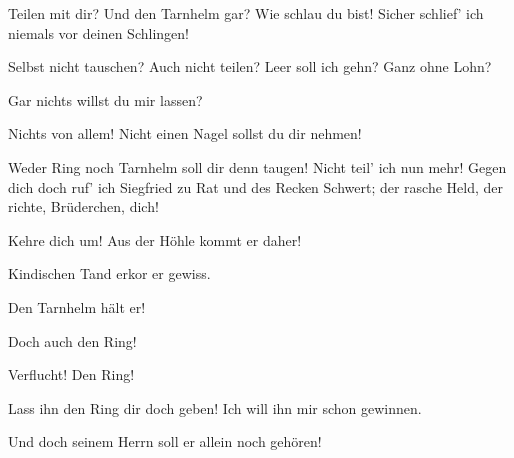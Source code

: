 \begin{drama}

\Alberichspeaks


Teilen mit dir?
Und den Tarnhelm gar?
Wie schlau du bist!
Sicher schlief' ich
niemals vor deinen Schlingen!

\Mimespeaks


Selbst nicht tauschen?
Auch nicht teilen?
Leer soll ich gehn?
Ganz ohne Lohn?


Gar nichts willst du mir lassen?

\Alberichspeaks

Nichts von allem!
Nicht einen Nagel
sollst du dir nehmen!

\Mimespeaks


Weder Ring noch Tarnhelm
soll dir denn taugen!
Nicht teil' ich nun mehr!
Gegen dich doch ruf' ich
Siegfried zu Rat
und des Recken Schwert;
der rasche Held,
der richte, Brüderchen, dich!


\Alberichspeaks

Kehre dich um!
Aus der Höhle kommt er daher!

\Mimespeaks


Kindischen Tand
erkor er gewiss.

\Alberichspeaks

Den Tarnhelm hält er!

\Mimespeaks

Doch auch den Ring!

\Alberichspeaks

Verflucht! Den Ring!

\Mimespeaks


Lass ihn den Ring dir doch geben!
Ich will ihn mir schon gewinnen.


\Alberichspeaks

Und doch seinem Herrn
soll er allein noch gehören!




\end{drama}
